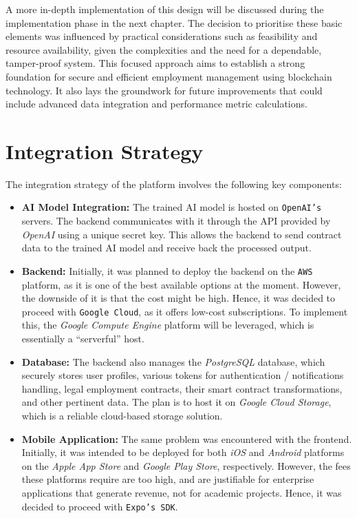 A more in-depth implementation of this design will be discussed during the implementation phase in the next chapter. The decision to prioritise these basic elements was influenced by practical considerations such as feasibility and resource availability, given the complexities and the need for a dependable, tamper-proof system. This focused approach aims to establish a strong foundation for secure and efficient employment management using blockchain technology. It also lays the groundwork for future improvements that could include advanced data integration and performance metric calculations.

\section{Integration Strategy}

The integration strategy of the platform involves the following key components:

\begin{itemize}
    \item \textbf{AI Model Integration:} The trained AI model is hosted on \texttt{OpenAI's} servers. The backend communicates with it through the API provided by \textit{OpenAI} using a unique secret key. This allows the backend to send contract data to the trained AI model and receive back the processed output.
    \item \textbf{Backend:} Initially, it was planned to deploy the backend on the \texttt{AWS} platform, as it is one of the best available options at the moment. However, the downside of it is that the cost might be high. Hence, it was decided to proceed with \texttt{Google Cloud}, as it offers low-cost subscriptions. To implement this, the \textit{Google Compute Engine} platform will be leveraged, which is essentially a ``serverful'' host.
    \item \textbf{Database:} The backend also manages the \textit{PostgreSQL} database, which securely stores user profiles, various tokens for authentication / notifications handling, legal employment contracts, their smart contract transformations, and other pertinent data. The plan is to host it on \textit{Google Cloud Storage}, which is a reliable cloud-based storage solution.
    \item \textbf{Mobile Application:} The same problem was encountered with the frontend. Initially, it was intended to be deployed for both \textit{iOS} and \textit{Android} platforms on the \textit{Apple App Store} and \textit{Google Play Store}, respectively. However, the fees these platforms require are too high, and are justifiable for enterprise applications that generate revenue, not for academic projects. Hence, it was decided to proceed with \texttt{Expo's SDK}.
\end{itemize}